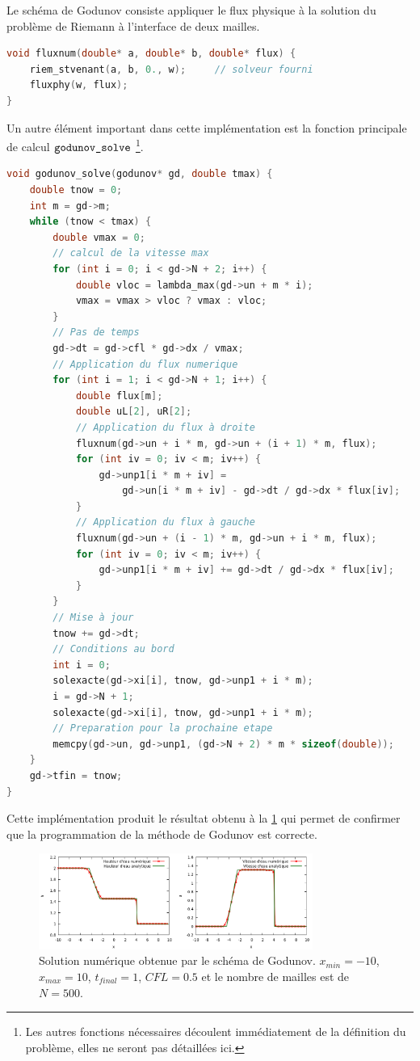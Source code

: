 \documentclass[
	french,
	11pt, %
]{fphw}
\begin{document}
Le schéma de Godunov consiste appliquer le flux physique à la solution du problème de Riemann à l'interface de deux mailles. 

\begin{lstlisting}[language=C, caption={Programmation du flux numérique de Godunov},breaklines]
void fluxnum(double* a, double* b, double* flux) {
	riem_stvenant(a, b, 0., w);		// solveur fourni
	fluxphy(w, flux);
}
\end{lstlisting}
Un autre élément important dans cette implémentation est la fonction principale de calcul $\verb|godunov_solve|$ \footnote{Les autres fonctions nécessaires découlent immédiatement de la définition du problème, elles ne seront pas détaillées ici.}.

\begin{lstlisting}[language=C, caption={Fonction de résolution du problème de Saint-Venant utilisée dans ce rapport (sauf indication contraire).},breaklines]
void godunov_solve(godunov* gd, double tmax) {
	double tnow = 0;
	int m = gd->m;
	while (tnow < tmax) {
		double vmax = 0;
		// calcul de la vitesse max
		for (int i = 0; i < gd->N + 2; i++) {
			double vloc = lambda_max(gd->un + m * i);
			vmax = vmax > vloc ? vmax : vloc;
		}
		// Pas de temps
		gd->dt = gd->cfl * gd->dx / vmax;
		// Application du flux numerique
		for (int i = 1; i < gd->N + 1; i++) {
			double flux[m];
			double uL[2], uR[2];
			// Application du flux à droite
			fluxnum(gd->un + i * m, gd->un + (i + 1) * m, flux);
			for (int iv = 0; iv < m; iv++) {
				gd->unp1[i * m + iv] =
					gd->un[i * m + iv] - gd->dt / gd->dx * flux[iv];
			}
			// Application du flux à gauche
			fluxnum(gd->un + (i - 1) * m, gd->un + i * m, flux);
			for (int iv = 0; iv < m; iv++) {
				gd->unp1[i * m + iv] += gd->dt / gd->dx * flux[iv];
			}
		}
		// Mise à jour
		tnow += gd->dt;
		// Conditions au bord
		int i = 0;
		solexacte(gd->xi[i], tnow, gd->unp1 + i * m);
		i = gd->N + 1;
		solexacte(gd->xi[i], tnow, gd->unp1 + i * m);
		// Preparation pour la prochaine etape
		memcpy(gd->un, gd->unp1, (gd->N + 2) * m * sizeof(double));
	}
	gd->tfin = tnow;
}	
\end{lstlisting}
Cette implémentation produit le résultat obtenu à la \cref{fig:SolGodunov500} qui permet de confirmer que la programmation de la méthode de Godunov est correcte.
\begin{figure}[h]
	\centering
	\includegraphics[width=0.8\textwidth]{SolGodunov500.png}
	\caption{Solution numérique obtenue par le schéma de Godunov. $x_{min}=-10$, $x_{max}=10$, $t_{final} = 1$, $CFL=0.5$ et le nombre de mailles est de $N=500$.}
	\label{fig:SolGodunov500}
\end{figure}
\end{document}
